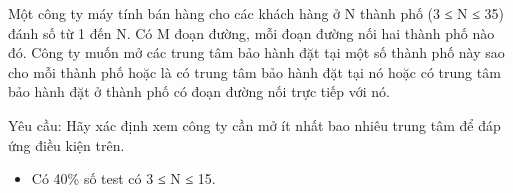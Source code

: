 Một công ty máy tính bán hàng cho các khách hàng ở N thành phố (3 ≤ N ≤ 35) đánh số từ 1 đến N. Có M đoạn đường, mỗi đoạn đường nối hai thành phố nào đó. Công ty muốn mở các trung tâm bảo hành đặt tại một số thành phố này sao cho mỗi thành phố hoặc là có trung tâm bảo hành đặt tại nó hoặc có trung tâm bảo hành đặt ở thành phố có đoạn đường nối trực tiếp với nó.  

   Yêu cầu: Hãy xác định xem công ty cần mở ít nhất bao nhiêu trung tâm để đáp ứng điều kiện trên.  

\begin{itemize}
	\item     Có 40\% số test có 3 ≤ N ≤ 15.   
\end{itemize}